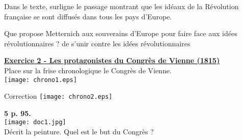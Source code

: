 \documentclass{beamer}
\begin{document}
 \begin{frame}
 Dans le texte, surligne le passage montrant que les idéaux de la Révolution française se sont diffusés dans tous les pays d'Europe.
 
\fbox{
\begin{minipage}{11cm}
Si, dans cette crise effrayante, les principaux souverains de l'Europe étaient désunis, nous serions tous emportés dans un petit nombre d'années.>>
\begin{flushright}
D'après le prince de Metternich, Chancelier d'Autriche, texte écrit en 1815.
\end{flushright}
\end{minipage}}
\end{frame}

\begin{frame}

 Que propose Metternich aux souverains d'Europe pour faire face aux idées révolutionnaires ? \pause \textcolor{black!70!green}{de s'unir contre les idées révolutionnaires}
 \end{frame}
 
 \begin{frame} \underline{\textbf{Exercice 2 - Les protagonistes du Congrès de Vienne (1815)}}\\
Place sur la frise chronologique le Congrès de Vienne.\\
\texttt{[image: chrono1.eps]}

\end{frame}

\begin{frame} Correction
\texttt{[image: chrono2.eps]}

\end{frame}
\begin{frame}
\textbf{5 p. 95.}\\
\texttt{[image: doc1.jpg]}\\
Décrit la peinture. %
\vfill
Quel est le but du Congrès ? %

 \end{frame}
 
\end{document}
